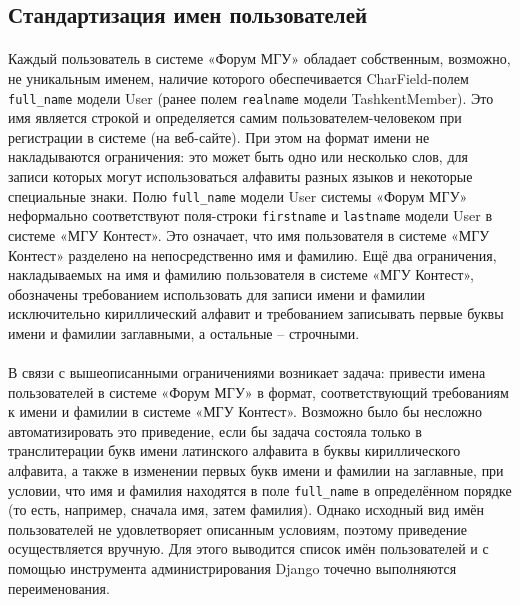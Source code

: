 \documentclass[12pt, a4paper, oneside]{article}
\begin{document}
\subsection{Стандартизация имен пользователей}
\paragraph{}
Каждый пользователь в системе «Форум МГУ» обладает собственным, возможно, не уникальным именем, наличие которого обеспечивается CharField-полем \texttt{full\_name} модели User (ранее полем \texttt{realname} модели TashkentMember). Это имя является строкой и определяется самим пользователем-человеком при регистрации в системе (на веб-сайте). При этом на формат имени не накладываются ограничения: это может быть одно или несколько слов, для записи которых могут использоваться алфавиты разных языков и некоторые специальные знаки.
Полю \texttt{full\_name} модели User системы «Форум МГУ» неформально соответствуют поля-строки \texttt{firstname} и \texttt{lastname} модели User в системе «МГУ Контест». Это означает, что имя пользователя в системе «МГУ Контест» разделено на непосредственно имя и фамилию. Ещё два ограничения, накладываемых на имя и фамилию пользователя в системе «МГУ Контест», обозначены требованием использовать для записи имени и фамилии исключительно кириллический алфавит и требованием записывать первые буквы имени и фамилии заглавными, а остальные – строчными.
\paragraph{}
В связи с вышеописанными ограничениями возникает задача: привести имена пользователей в системе «Форум МГУ» в формат, соответствующий требованиям к имени и фамилии в системе «МГУ Контест». Возможно было бы несложно автоматизировать это приведение, если бы задача состояла только в транслитерации букв имени латинского алфавита в буквы кириллического алфавита, а также в изменении первых букв имени и фамилии на заглавные, при условии, что имя и фамилия находятся в поле \texttt{full\_name} в определённом порядке (то есть, например, сначала имя, затем фамилия). Однако исходный вид имён пользователей не удовлетворяет описанным условиям, поэтому приведение осуществляется вручную. Для этого выводится список имён пользователей и с помощью инструмента администрирования Django точечно выполняются переименования.
\end{document}
